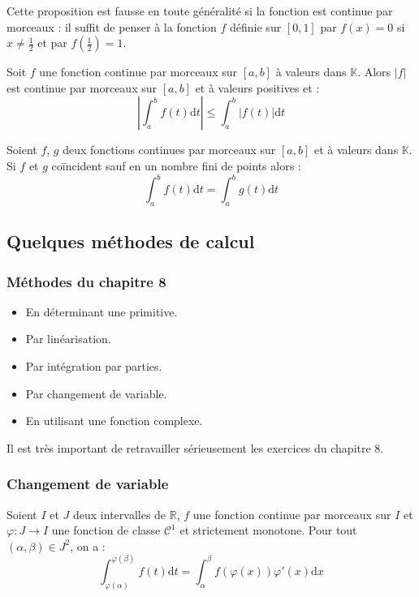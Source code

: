 \documentclass[french,11pt,twoside]{VcCours}
\newcommand{\dx}{\text{d}x}
\newcommand{\dt}{\text{d}t}
\begin{document}
\begin{Remarque}[\alerte]{} Cette proposition est fausse en toute généralité si la fonction est continue par morceaux : il suffit de penser à la fonction $f$ définie sur $[0,1]$ par $f(x)=0$ si $x \neq \frac{1}{2}$ et par $f(\frac{1}{2})=1$.
\end{Remarque}

\begin{Proposition}{} Soit $f$ une fonction continue par morceaux sur $[a,b]$ à valeurs dans $\mathbb{K}$. Alors $\vert f \vert$ est continue par morceaux   sur $[a,b]$ et à valeurs positives et :
$$ \left\vert \int_{a}^b f(t) \dt \right\vert \leq \int_{a}^b \vert f(t) \vert \dt $$
\end{Proposition}

\begin{Proposition}{} Soient $f$, $g$ deux fonctions continues par morceaux sur $[a,b]$ et à valeurs dans $\mathbb{K}$. Si $f$ et $g$ coïncident sauf en un nombre fini de points alors :
$$ \int_{a}^b f(t) \dt = \int_{a}^b g(t) \dt $$
\end{Proposition}

\subsection{Quelques méthodes de calcul}
\subsubsection{Méthodes du chapitre 8}

\begin{itemize}
\item En déterminant une primitive.
\item Par linéarisation.
\item Par intégration par parties.
\item Par changement de variable.
\item En utilisant une fonction complexe.
\end{itemize}

Il est très important de retravailler sérieusement les exercices du chapitre 8. 

\subsubsection{Changement de variable}

\begin{Proposition}{} Soient $I$ et $J$ deux intervalles de $\mathbb{R}$, $f$ une fonction continue par morceaux sur $I$ et $\varphi : J \rightarrow I$ une fonction de classe $\mathcal{C}^1$ et strictement monotone. Pour tout $(\alpha, \beta) \in J^2$, on a :
$$ \int_{\varphi(\alpha)}^{\varphi(\beta)} f(t) \dt = \int_{\alpha}^{\beta} f( \varphi(x)) \varphi'(x) \dx$$
\end{Proposition}
\end{document}
